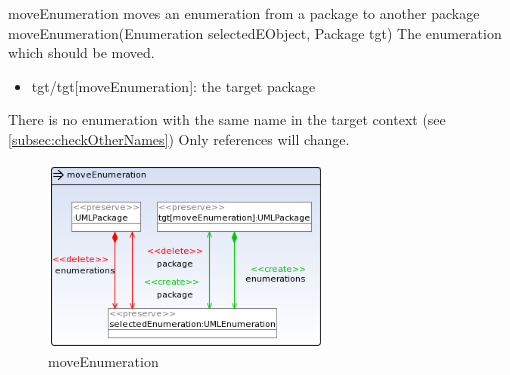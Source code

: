 \op
{moveEnumeration}
{moves an enumeration from a package to another package}
{moveEnumeration(Enumeration selectedEObject, Package tgt)}
{The enumeration which should be moved.}
{
\begin{itemize}
 \item tgt/tgt[moveEnumeration]: the target package
\end{itemize}
}
{There is no enumeration with the same name in the target context (see
\ref{subsec:checkOtherNames})}
{Only references will change.}
\begin{figure}[H]
  \centering
  \includegraphics[width=0.65\textwidth]{pics/moveEnumeration.png}
  \caption{moveEnumeration}
  \label{moveEnumeration}
\end{figure}